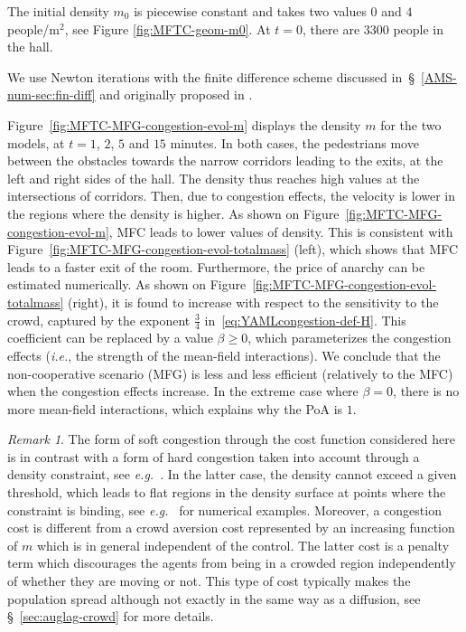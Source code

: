 \documentclass{amsproc}
\theoremstyle{definition}
\theoremstyle{remark}
\newtheorem{remark}[theorem]{Remark}
\numberwithin{equation}{section}
\begin{document}
The initial density $m_0$ is piecewise constant and takes two values $0$ and $4$ people/m$^2$, see Figure \ref{fig:MFTC-geom-m0}.
At $t=0$, there are 3300 people in the hall.%

We use  Newton iterations with the finite difference scheme discussed in~\S~\ref{AMS-num-sec:fin-diff} and originally proposed in \cite{MR2679575}.



Figure~\ref{fig:MFTC-MFG-congestion-evol-m} displays the density $m$ for the two models, at $t=1$, $2$, $5$ and $15$ minutes. 
In both cases, the pedestrians move between the obstacles towards the narrow corridors leading to the exits, at the left and right sides of the hall. The density thus reaches high values at the intersections of corridors. Then, due to congestion effects, the velocity is lower in the regions where the density is higher. As shown on Figure~\ref{fig:MFTC-MFG-congestion-evol-m}, MFC leads to
 lower values of density. This is consistent with Figure~\ref{fig:MFTC-MFG-congestion-evol-totalmass} (left), which shows that MFC leads to a faster exit of the room. Furthermore, the price of anarchy can be estimated numerically. As shown on Figure~\ref{fig:MFTC-MFG-congestion-evol-totalmass} (right), it is found to increase with respect to the sensitivity to the crowd, captured by the exponent $\frac{3}{4}$ in~\eqref{eq:YAMLcongestion-def-H}. This coefficient can be replaced by a value $\beta\ge0$, which parameterizes the congestion effects (\textit{i.e.}, the strength of the mean-field interactions). We conclude that the non-cooperative scenario (MFG) is less and less efficient (relatively to the MFC) when the congestion effects increase. In the extreme case where $\beta=0$, there is no more mean-field interactions, which explains why the PoA is $1$.
 

 \begin{remark}
 \label{rem:congestion}
 	The form of soft congestion through the cost function considered here is in contrast with a form of hard congestion taken into account through a density constraint, see \textit{e.g.}~\cite{MR3420414,MR3556062}. In the latter case, the density cannot exceed a given threshold, which leads to flat regions in the density surface at points where the constraint is binding, see \textit{e.g.}~\cite{MR3772008} for numerical examples. Moreover, a congestion cost is different from a crowd aversion cost represented by an increasing function of $m$ which is in general independent of the control. The latter cost is a penalty term which discourages the agents from being in a crowded region independently of whether they are moving or not. This type of cost typically makes the population spread although not exactly in the same way as a diffusion, see \S~\ref{sec:auglag-crowd} for more details.
 \end{remark}
 
\end{document}
